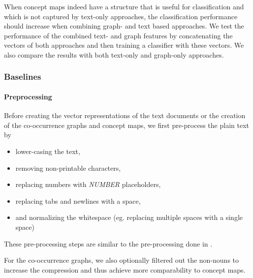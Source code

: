 
When concept maps indeed have a structure that is useful for classification and which is not captured by text-only approaches, the classification performance should increase when combining graph- and text based approaches.
We test the performance of the combined text- and graph features by concatenating the vectors of both approaches and then training a classifier with these vectors.
We also compare the results with both text-only and graph-only approaches.

\subsubsection{Baselines}
\paragraph{Preprocessing}
Before creating the vector representations of the text documents or the creation of the co-occurrence graphs and concept maps, we first pre-process the plain text by

\begin{itemize}
\item{lower-casing the text,}
\item{removing non-printable characters,}
\item{replacing numbers with \textit{NUMBER} placeholders,}
\item{replacing tabs and newlines with a space,}
\item{and normalizing the whitespace (eg. replacing multiple spaces with a single space)}
\end{itemize}
These pre-processing steps are similar to the pre-processing done in \cite{Cachopo2007}.


For the co-occurrence graphs, we also optionally filtered out the non-nouns to increase the compression and thus achieve more comparability to concept maps.

